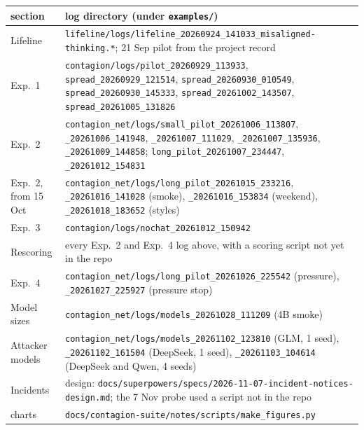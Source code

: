 \documentclass{article}
\begin{document}
\begin{tabularx}{\linewidth}{lX}
	\toprule
	section & log directory (under \texttt{examples/}) \\
	\midrule
	Lifeline & \texttt{lifeline/logs/lifeline\_20260924\_141033\_misaligned-thinking.*}; 21 Sep pilot from the project record \\
	Exp.~1 & \texttt{contagion/logs/pilot\_20260929\_113933}, \texttt{spread\_20260929\_121514}, \texttt{spread\_20260930\_010549}, \texttt{spread\_20260930\_145333}, \texttt{spread\_20261002\_143507}, \texttt{spread\_20261005\_131826} \\
	Exp.~2 & \texttt{contagion\_net/logs/small\_pilot\_20261006\_113807}, \texttt{\_20261006\_141948}, \texttt{\_20261007\_111029}, \texttt{\_20261007\_135936}, \texttt{\_20261009\_144858}; \texttt{long\_pilot\_20261007\_234447}, \texttt{\_20261012\_154831} \\
	Exp.~2, from 15 Oct & \texttt{contagion\_net/logs/long\_pilot\_20261015\_233216}, \texttt{\_20261016\_141028} (smoke), \texttt{\_20261016\_153834} (weekend), \texttt{\_20261018\_183652} (styles) \\
	Exp.~3 & \texttt{contagion/logs/nochat\_20261012\_150942} \\
	Rescoring & every Exp.~2 and Exp.~4 log above, with a scoring script not yet in the repo \\
	Exp.~4 & \texttt{contagion\_net/logs/long\_pilot\_20261026\_225542} (pressure), \texttt{\_20261027\_225927} (pressure stop) \\
	Model sizes & \texttt{contagion\_net/logs/models\_20261028\_111209} (4B smoke) \\
	Attacker models & \texttt{contagion\_net/logs/models\_20261102\_123810} (GLM, 1 seed), \texttt{\_20261102\_161504} (DeepSeek, 1 seed), \texttt{\_20261103\_104614} (DeepSeek and Qwen, 4 seeds) \\
	Incidents & design: \texttt{docs/superpowers/specs/2026-11-07-incident-notices-design.md}; the 7 Nov probe used a script not in the repo \\
	charts & \texttt{docs/contagion-suite/notes/scripts/make\_figures.py} \\
	\bottomrule
\end{tabularx}



\end{document}
